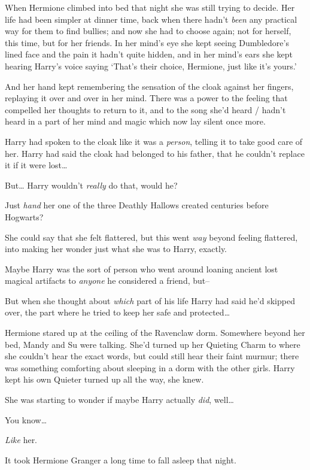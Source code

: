 When Hermione climbed into bed that night she was still trying to decide. Her life had been simpler at dinner time, back when there hadn't \emph{been} any practical way for them to find bullies; and now she had to choose again; not for herself, this time, but for her friends. In her mind's eye she kept seeing Dumbledore's lined face and the pain it hadn't quite hidden, and in her mind's ears she kept hearing Harry's voice saying `That's their choice, Hermione, just like it's yours.'

And her hand kept remembering the sensation of the cloak against her fingers, replaying it over and over in her mind. There was a power to the feeling that compelled her thoughts to return to it, and to the song she'd heard / hadn't heard in a part of her mind and magic which now lay silent once more.

Harry had spoken to the cloak like it was a \emph{person}, telling it to take good care of her. Harry had said the cloak had belonged to his father, that he couldn't replace it if it were lost{\ldots}

But{\ldots} Harry wouldn't \emph{really} do that, would he?

Just \emph{hand} her one of the three Deathly Hallows created centuries before Hogwarts?

She could say that she felt flattered, but this went \emph{way} beyond feeling flattered, into making her wonder just what she was to Harry, exactly.

Maybe Harry was the sort of person who went around loaning ancient lost magical artifacts to \emph{anyone} he considered a friend, but\---

But when she thought about \emph{which} part of his life Harry had said he'd skipped over, the part where he tried to keep her safe and protected{\ldots}

Hermione stared up at the ceiling of the Ravenclaw dorm. Somewhere beyond her bed, Mandy and Su were talking. She'd turned up her Quieting Charm to where she couldn't hear the exact words, but could still hear their faint murmur; there was something comforting about sleeping in a dorm with the other girls. Harry kept his own Quieter turned up all the way, she knew.

She was starting to wonder if maybe Harry actually \emph{did}, well{\ldots}

You know{\ldots}

\emph{Like} her.

It took Hermione Granger a long time to fall asleep that night.

